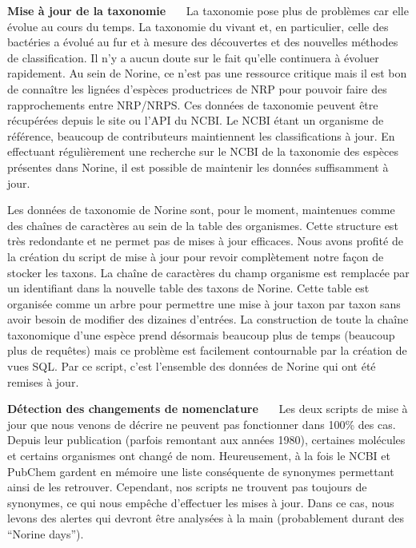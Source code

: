 \textbf{Mise à jour de la taxonomie}~~~
La taxonomie pose plus de problèmes car elle évolue au cours du temps.
La taxonomie du vivant et, en particulier, celle des bactéries a évolué au fur et à mesure des découvertes et des nouvelles méthodes de classification.
Il n'y a aucun doute sur le fait qu'elle continuera à évoluer rapidement.
Au sein de Norine, ce n'est pas une ressource critique mais il est bon de connaître les lignées d'espèces productrices de NRP pour pouvoir faire des rapprochements entre NRP/NRPS.
Ces données de taxonomie peuvent être récupérées depuis le site ou l'API du NCBI.
Le NCBI étant un organisme de référence, beaucoup de contributeurs maintiennent les classifications à jour.
En effectuant régulièrement une recherche sur le NCBI de la taxonomie des espèces présentes dans Norine, il est possible de maintenir les données suffisamment à jour.

Les données de taxonomie de Norine sont, pour le moment, maintenues comme des chaînes de caractères au sein de la table des organismes.
Cette structure est très redondante et ne permet pas de mises à jour efficaces.
Nous avons profité de la création du script de mise à jour pour revoir complètement notre façon de stocker les taxons.
La chaîne de caractères du champ organisme est remplacée par un identifiant dans la nouvelle table des taxons de Norine.
Cette table est organisée comme un arbre pour permettre une mise à jour taxon par taxon sans avoir besoin de modifier des dizaines d'entrées.
La construction de toute la chaîne taxonomique d'une espèce prend désormais beaucoup plus de temps (beaucoup plus de requêtes) mais ce problème est facilement contournable par la création de vues SQL.
Par ce script, c'est l'ensemble des données de Norine qui ont été remises à jour.


\textbf{Détection des changements de nomenclature}~~~
Les deux scripts de mise à jour que nous venons de décrire ne peuvent pas fonctionner dans 100\% des cas.
Depuis leur publication (parfois remontant aux années 1980), certaines molécules et certains organismes ont changé de nom.
Heureusement, à la fois le NCBI et PubChem gardent en mémoire une liste conséquente de synonymes permettant ainsi de les retrouver.
Cependant, nos scripts ne trouvent pas toujours de synonymes, ce qui nous empêche d'effectuer les mises à jour.
Dans ce cas, nous levons des alertes qui devront être analysées à la main (probablement durant des ``Norine days'').


